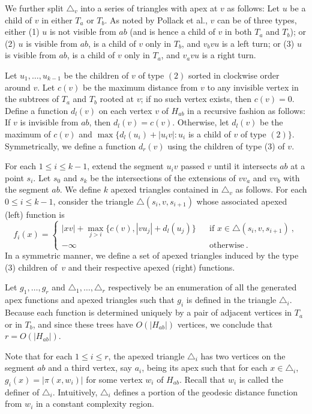 \documentclass[a4paper,UKenglish]{lipics}
\newcommand{\g}[2]{\ensuremath{|\pi(#1, #2)|}}
\begin{document}
We further split $\triangle_v$ into a series of triangles with apex at $v$ as follows: 
Let $u$ be a child of $v$ in either $T_a$ or $T_b$. As noted by Pollack et al., $v$ can be of three types, either (1) $u$ is not visible from $ab$ (and is hence a child of $v$ in both $T_a$ and $T_b$); or (2) $u$ is visible from $ab$, is a child of $v$ only in $T_b$, and $v_b v u$ is a left turn; or (3) $u$ is visible from $ab$, is a child of $v$ only in $T_a$, and $v_a v u$ is a right turn.

Let $u_1, \ldots, u_{k-1}$ be the children of $v$ of type $(2)$ sorted in clockwise order around $v$.
Let $c(v)$ be the maximum distance from $v$ to any invisible vertex in the subtrees of $T_a$ and $T_b$ rooted at $v$; if no such vertex exists, then $c(v) = 0$. 
Define a function $d_l(v)$ on each vertex $v$ of $H_{ab}$ in a recursive fashion as follows:
If $v$ is invisible from $ab$, then $d_l(v) = c(v)$. 
Otherwise, let $d_l(v)$ be the maximum of $c(v)$ and $\max\{d_l(u_i) + |u_iv| : u_i$ is a child of $v$ of type $(2)\}$.
Symmetrically, we define a function $d_r(v)$ using the children of type (3) of $v$.

For each $1\leq i\leq k-1$, extend the segment $u_iv$ passed $v$ until it intersects $ab$ at a point $s_i$. Let $s_0$ and $s_k$ be the intersections of the extensions of $vv_a$ and $vv_b$ with the segment $ab$.
We define $k$ apexed triangles contained in $\triangle_v$ as follows. 
For each $0\leq i\leq k-1$, consider the triangle $\triangle(s_i, v, s_{i+1})$ whose associated apexed (left) function is 
$$f_i(x) = \left\{ \begin{array}{lll}
|xv| + \max_{j>i}\{c(v), |vu_j| + d_l(u_j)\} && \text{if $x\in \triangle(s_i, v, s_{i+1})$}\ ,\\
-\infty&&\text{otherwise}\ .
\end{array}\right.$$
In a symmetric manner, we define a set of apexed triangles induced by the type (3) children of~$v$ and their respective apexed (right) functions.

Let $g_1, \ldots, g_r$ and $\triangle_1, \ldots, \triangle_r$ respectively be an enumeration of all the generated apex functions and apexed triangles such that $g_i$ is defined in the triangle $\triangle_i$. Because each function is determined uniquely by a pair of adjacent vertices in $T_a$ or in $T_b$, and since these trees have $O(|H_{ab}|)$ vertices, we conclude that $r = O(|H_{ab}|)$. 

Note that for each $1\leq i\leq r$, the apexed triangle $\triangle_i$ has two vertices on the segment $ab$ and a third vertex, say $a_i$, being its apex such that for each $x\in \triangle_i$, $g_i(x) = \g{x}{w_i}$ for some vertex $w_i$ of $H_{ab}$. Recall that $w_i$ is called the definer of $\triangle_i$. Intuitively, $\triangle_i$ defines a portion of the geodesic distance function from $w_i$ in a constant complexity region. 
\end{document}
